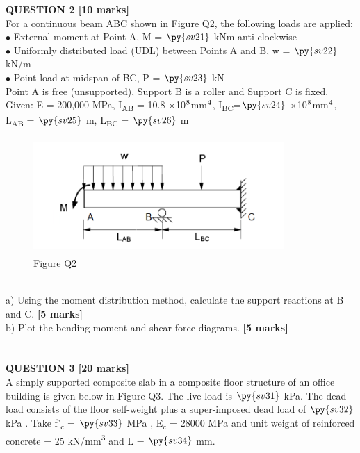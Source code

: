 \documentclass[a4paper,11pt]{article}
\begin{document}
\noindent
\textbf{QUESTION 2 [10 marks]}\\
For a continuous beam ABC shown in Figure Q2, the following loads are applied:\\
$\bullet$ External moment at Point A, M = $\py{sv21}$ kNm  anti-clockwise\\
$\bullet$ Uniformly distributed load (UDL) between Points A and B, w = $\py{sv22}$ kN/m \\
$\bullet$ Point load at midspan of BC, P = $\py{sv23}$ kN \\
Point A is free (unsupported), Support B is a roller and Support C is fixed.\\
Given: E = 200,000 MPa, I\textsubscript{AB} = 10.8 $\times$10$\textsuperscript{8}$mm$\textsuperscript{4}$, I\textsubscript{BC}=$\py{sv24}$ $\times$10$\textsuperscript{8}$mm$\textsuperscript{4}$, L\textsubscript{AB} = $\py{sv25}$ m, L\textsubscript{BC} = $\py{sv26}$ m\\
\begin{figure}[ht]
\includegraphics[width=9.53cm, height=4.37cm]{P2.png}\\
\centering
Figure Q2\\
\centering
\end{figure}
\\
a) Using the moment distribution method, calculate the support reactions at B and C. \textbf{[5 marks]}\\
b) Plot the bending moment and shear force diagrams. \textbf{[5 marks]}\\
\\
\\
\textbf{QUESTION 3 [20 marks]}\\
A simply supported composite slab in a composite floor structure of an office building is given below in Figure Q3. The live load is $\py{sv31}$ kPa. The dead load consists of the floor self-weight plus a super-imposed dead load of $\py{sv32}$ kPa . Take f'\textsubscript{c} = $\py{sv33}$ MPa , E\textsubscript{c} = 28000 MPa and unit weight of reinforced concrete = 25 kN/mm\textsuperscript{3} and L = $\py{sv34}$ mm.\\
\end{document}
